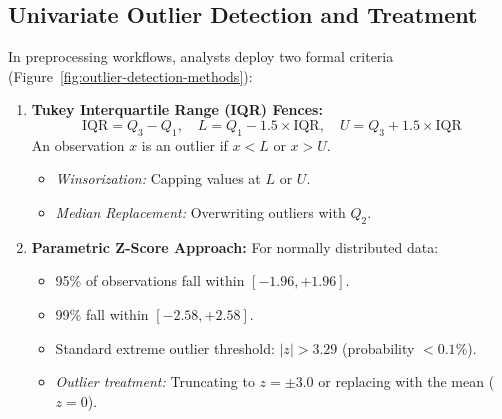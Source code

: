 \subsection{Univariate Outlier Detection and Treatment}
In preprocessing workflows, analysts deploy two formal criteria (Figure~\ref{fig:outlier-detection-methods}):
\begin{enumerate}
    \item \textbf{Tukey Interquartile Range (IQR) Fences:}
    \begin{equation}
    \text{IQR} = Q_3 - Q_1, \quad L = Q_1 - 1.5 \times \text{IQR}, \quad U = Q_3 + 1.5 \times \text{IQR}
    \end{equation}
    An observation $x$ is an outlier if $x < L$ or $x > U$.
    \begin{itemize}
        \item \textit{Winsorization:} Capping values at $L$ or $U$.
        \item \textit{Median Replacement:} Overwriting outliers with $Q_2$.
    \end{itemize}
    \item \textbf{Parametric Z-Score Approach:}
    For normally distributed data:
    \begin{itemize}
        \item 95\% of observations fall within $[ -1.96, +1.96 ]$.
        \item 99\% fall within $[ -2.58, +2.58 ]$.
        \item Standard extreme outlier threshold: $|z| > 3.29$ (probability $< 0.1\%$).
        \item \textit{Outlier treatment:} Truncating to $z = \pm 3.0$ or replacing with the mean ($z = 0$).
    \end{itemize}
\end{enumerate}

